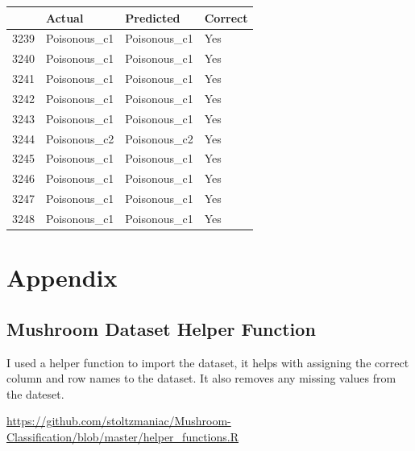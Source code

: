 \documentclass[10pt  ,usenames, dvipsnames]{article}\usepackage[]{graphicx}\usepackage[]{color}
\begin{document}
\begin{table}[ht]
\centering
\begin{tabular}{rlll}
  \hline
 & Actual & Predicted & Correct \\ 
  \hline
3239 & Poisonous\_c1 & Poisonous\_c1 & Yes \\ 
  3240 & Poisonous\_c1 & Poisonous\_c1 & Yes \\ 
  3241 & Poisonous\_c1 & Poisonous\_c1 & Yes \\ 
  3242 & Poisonous\_c1 & Poisonous\_c1 & Yes \\ 
  3243 & Poisonous\_c1 & Poisonous\_c1 & Yes \\ 
  3244 & Poisonous\_c2 & Poisonous\_c2 & Yes \\ 
  3245 & Poisonous\_c1 & Poisonous\_c1 & Yes \\ 
  3246 & Poisonous\_c1 & Poisonous\_c1 & Yes \\ 
  3247 & Poisonous\_c1 & Poisonous\_c1 & Yes \\ 
  3248 & Poisonous\_c1 & Poisonous\_c1 & Yes \\ 
   \hline
\end{tabular}
\end{table}



\clearpage

\section{Appendix}

\subsection{Mushroom Dataset Helper Function}

I used a helper function to import the dataset, it helps with assigning the correct column and row names to the dataset. It also removes any missing values from the dateset.

\url{https://github.com/stoltzmaniac/Mushroom-Classification/blob/master/helper_functions.R}
\end{document}
